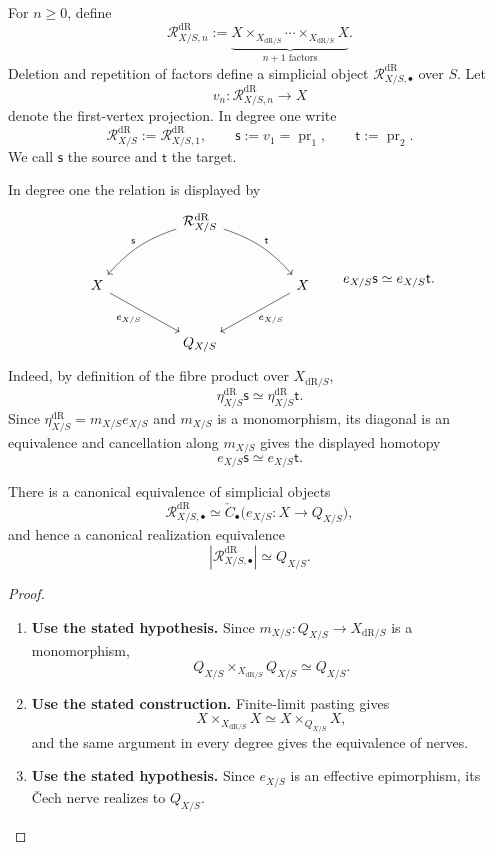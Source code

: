\begin{definition}
For \(n\geq0\), define
\[
  \mathcal R^{\mathrm{dR}}_{X/S,n}
  :=
  \underbrace{
  X\times_{X_{\mathrm{dR}/S}}\cdots\times_{X_{\mathrm{dR}/S}}X
  }_{n+1\text{ factors}}.
\]
Deletion and repetition of factors define a simplicial object
\(\mathcal R^{\mathrm{dR}}_{X/S,\bullet}\) over \(S\). Let
\[
  v_n:\mathcal R^{\mathrm{dR}}_{X/S,n}\longrightarrow X
\]
denote the first-vertex projection. In degree one write
\[
  \mathcal R^{\mathrm{dR}}_{X/S}:=\mathcal R^{\mathrm{dR}}_{X/S,1},
  \qquad
  \mathsf s:=v_1=\operatorname{pr}_1,
  \qquad
  \mathsf t:=\operatorname{pr}_2.
\]
We call \(\mathsf s\) the source and \(\mathsf t\) the target.

In degree one the relation is displayed by
\[
\begin{tikzcd}[column sep=huge,row sep=large]
  &
  \mathcal R^{\mathrm{dR}}_{X/S}
    \arrow[dl,bend right=15,"\mathsf s"']
    \arrow[dr,bend left=15,"\mathsf t"]
  &
  \\
  X
    \arrow[dr,"e_{X/S}"']
  &&
  X
    \arrow[dl,"e_{X/S}"]
  \\
  &
  Q_{X/S}
  &
\end{tikzcd}
\qquad
e_{X/S}\mathsf s\simeq e_{X/S}\mathsf t.
\]
Indeed, by definition of the fibre product over \(X_{\mathrm{dR}/S}\),
\[
  \eta_{X/S}^{\mathrm{dR}}\mathsf s
  \simeq
  \eta_{X/S}^{\mathrm{dR}}\mathsf t.
\]
Since \(\eta_{X/S}^{\mathrm{dR}}=m_{X/S}e_{X/S}\) and \(m_{X/S}\) is a monomorphism, its
diagonal is an equivalence and cancellation along \(m_{X/S}\) gives the displayed
homotopy
\[
  e_{X/S}\mathsf s\simeq e_{X/S}\mathsf t.
\]

\end{definition}

\begin{theorem}
\label{thm:relation-effective-presentation}
There is a canonical equivalence of simplicial objects
\[
  \mathcal R^{\mathrm{dR}}_{X/S,\bullet}
  \simeq
  \check C_\bullet
  \bigl(e_{X/S}:X\to Q_{X/S}\bigr),
\]
and hence a canonical realization equivalence
\[
  |\mathcal R^{\mathrm{dR}}_{X/S,\bullet}|
  \simeq
  Q_{X/S}.
\]
\end{theorem}

\begin{proof}
\leavevmode
\begin{enumerate}[label=\textup{(\arabic*)}]
    \item \textbf{Use the stated hypothesis.}
    Since \(m_{X/S}:Q_{X/S}\to X_{\mathrm{dR}/S}\) is a monomorphism,
    \[
    Q_{X/S}\times_{X_{\mathrm{dR}/S}}Q_{X/S}
    \simeq
    Q_{X/S}.
    \]
    \item \textbf{Use the stated construction.}
    Finite-limit pasting gives
    \[
    X\times_{X_{\mathrm{dR}/S}}X
    \simeq
    X\times_{Q_{X/S}}X,
    \]
    and the same argument in every degree gives the equivalence of nerves.
    \item \textbf{Use the stated hypothesis.}
    Since
    \(e_{X/S}\) is an effective epimorphism, its \v{C}ech nerve realizes to
    \(Q_{X/S}\).
\end{enumerate}
\end{proof}

